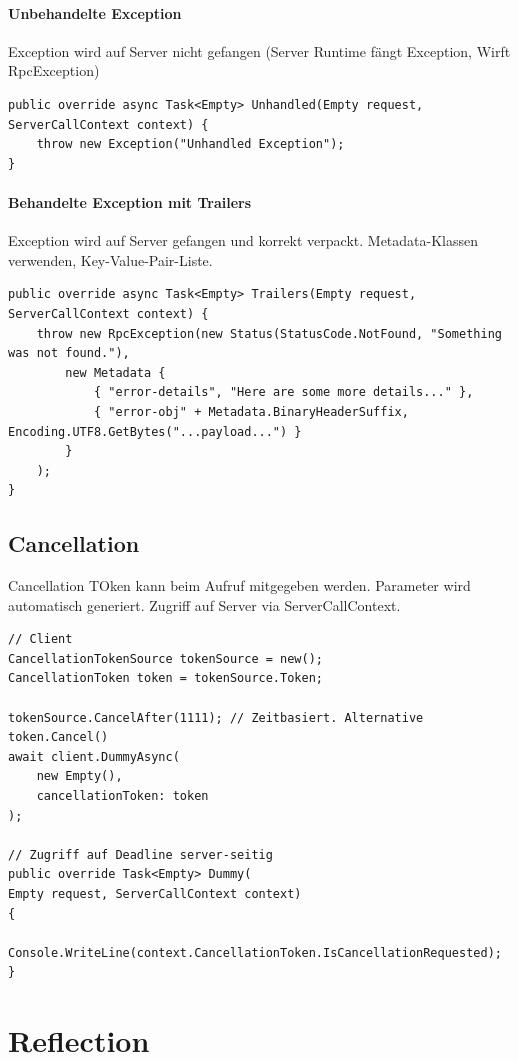 \documentclass[
a4paper,
oneside,
10pt,
fleqn,
headsepline,
toc=listofnumbered, 
bibliography=totocnumbered]{scrartcl}
\let\stdsection\section
\renewcommand\section{\clearpage\stdsection}
\begin{document}
\paragraph{Unbehandelte Exception} Exception wird auf Server nicht gefangen (Server Runtime fängt Exception, Wirft RpcException)
\begin{lstlisting}
public override async Task<Empty> Unhandled(Empty request, ServerCallContext context) {
    throw new Exception("Unhandled Exception");
}
\end{lstlisting}

\paragraph{Behandelte Exception mit Trailers} Exception wird auf Server gefangen und korrekt verpackt. Metadata-Klassen verwenden, Key-Value-Pair-Liste.
\begin{lstlisting}
public override async Task<Empty> Trailers(Empty request, ServerCallContext context) {
    throw new RpcException(new Status(StatusCode.NotFound, "Something was not found."),
        new Metadata {
            { "error-details", "Here are some more details..." },
            { "error-obj" + Metadata.BinaryHeaderSuffix, Encoding.UTF8.GetBytes("...payload...") }
        }
    );
}
\end{lstlisting}

\subsection{Cancellation}
Cancellation TOken kann beim Aufruf mitgegeben werden. Parameter wird automatisch generiert. Zugriff auf Server via ServerCallContext.
\begin{lstlisting}
// Client
CancellationTokenSource tokenSource = new();
CancellationToken token = tokenSource.Token;

tokenSource.CancelAfter(1111); // Zeitbasiert. Alternative token.Cancel()
await client.DummyAsync(
    new Empty(),
    cancellationToken: token
);

// Zugriff auf Deadline server-seitig
public override Task<Empty> Dummy(
Empty request, ServerCallContext context)
{
	Console.WriteLine(context.CancellationToken.IsCancellationRequested);
}
\end{lstlisting}

\section{Reflection}
\end{document}
